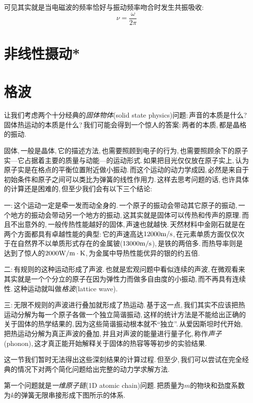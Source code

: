 可见其实就是当电磁波的频率恰好与振动频率吻合时发生共振吸收:
\[\nu=\frac{\omega}{2\pi}\]
\newpage


\section{非线性摄动*}



\section{格波}

让我们考虑两个十分经典的\emph{固体物体}(solid state physics)问题:\,声音的本质是什么?\,固体热运动的本质是什么?\,我们可能会得到一个惊人的答案:\,两者的本质,\,都是晶格的振动.

固体,\,一般是晶体,\,它的描述方法,\,也需要照顾到电子的行为,\,也需要照顾余下的原子实---它占据着主要的质量与动能---的运动形式.\,如果把目光仅仅放在原子实上,\,认为原子实是在格点的平衡位置附近做小振动.\,而这个运动的动力学成因,\,必然是来自于初始条件和原子之间可以类比为弹簧的线性作用力.\,这样去思考问题的话,\,也许具体的计算还是困难的,\,但至少我们会有以下三个结论:

一:\,这个运动一定是牵一发而动全身的.\,一个原子的振动会带动其它原子的振动,\,一个地方的振动会带动另一个地方的振动,\,这其实就是固体可以传热和传声的原理.\,而且不出意外的,\,一般传热性能越好的固体,\,声速也就越快.\,天然材料中金刚石就是在两个方面都具有卓越性能的典型:\,它的声速高达$12000{\rm m/s}$,\,在元素单质方面仅仅次于在自然界不以单质形式存在的金属铍($13000{\rm m/s}$),\,是铁的两倍多.\,而热导率则是达到了惊人的$2000{\rm W/m\cdot K}$,\,为金属中导热性能优异的银的约五倍.

二:\,有规则的这种运动形成了声波.\,也就是宏观问题中看似连续的声波,\,在微观看来其实就是一个个分立的原子在因为弹性力而做多自由度的小振动,\,而不再具有连续性.\,这种运动就叫做\emph{格波}(lattice wave).

三:\,无限不规则的声波进行叠加就形成了热运动.\,基于这一点,\,我们其实不应该把热运动分解为每一个原子各做一个独立简谐振动,\,这样的统计方法是不能给出正确的关于固体的热学结果的,\,因为这些简谐振动根本就不``独立''.\,从爱因斯坦时代开始,\,把热运动分解为真正声波的叠加,\,并且对声波的能量进行量子化,\,称作\emph{声子}(phonon),\,这才真正能开始解释关于固体的热容等等初步的实验结果.

这一节我们暂时无法得出这些深刻结果的计算过程.\,但至少,\,我们可以尝试在完全经典的情况下对两个简化问题给出完整的动力学求解方法.

第一个问题就是\emph{一维原子链}(1D atomic chain)问题.\,把质量为$m$的物块和劲度系数为$k$的弹簧无限串接形成下图所示的体系.

